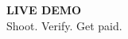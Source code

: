 {
\begin{frame}[plain]
  \centering\vspace{3em}
  {\fontsize{60}{66}\selectfont\bfseries\color{white}LIVE DEMO}\\[1em]
  {\Large\color{white!80} Shoot. Verify. Get paid.}
\end{frame}
}
